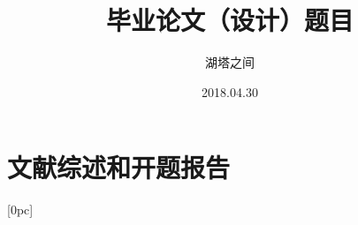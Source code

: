 \documentclass[fangfont=STFANGSO.TTF,heifont=simhei.ttf,nocolorbib]{zju-thesis}
\title{毕业论文（设计）题目}{浙江大学本科生毕业论文（设计）}
\author{湖塔之间}{3140100000}
\date{2018.04.30}
\begin{document}
	\makecover
	
	
	

	

    \tableofcontents
	\begin{refsection}
	
	\end{refsection}
	
	

	
	
	\part{文献综述和开题报告}
	\renewcommand\thechapter{\zhnum{chapter}、}
	[0pc]{\addvspace{0pt}\hspace*{0pc}}{\thecontentslabel}{}{
	\thecontentspage} 
	
\end{document}
